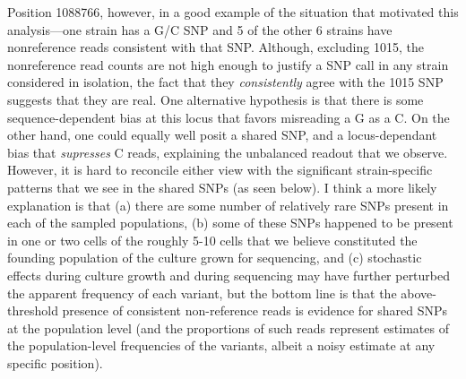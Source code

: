 \documentclass{article}\usepackage[]{graphicx}\usepackage[]{color}
\begin{document}
Position 1088766, however, in a good example of the situation that motivated this analysis---one strain has a G/C SNP
and 5 of the other 6 strains have nonreference reads consistent with that SNP.  Although, excluding 1015, the
nonreference read counts are not high enough to justify a SNP call in any strain considered in isolation, the fact that
they \emph{consistently} agree with the 1015 SNP suggests that they are real.  One alternative hypothesis is that there
is some sequence-dependent bias at this locus that favors misreading a G as a C.  On the other hand, one could equally
well posit a shared SNP, and a locus-dependant bias that \emph{supresses} C reads, explaining the unbalanced readout
that we observe.  However, it is hard to reconcile either view with the significant strain-specific patterns that we see
in the shared SNPs (as seen below).  I think a more likely explanation is that (a) there are some number of relatively
rare SNPs present in each of the sampled populations, (b) some of these SNPs happened to be present in one or two cells
of the roughly 5-10 cells that we believe constituted the founding population of the culture grown for sequencing, and
(c) stochastic effects during culture growth and during sequencing may have further perturbed the apparent frequency of
each variant, but the bottom line is that the above-threshold presence of consistent non-reference reads is evidence for
shared SNPs at the population level (and the proportions of such reads represent estimates of the population-level
frequencies of the variants, albeit a noisy estimate at any specific position).
\end{document}
